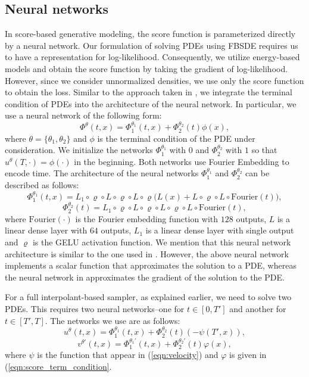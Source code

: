 \subsection{Neural networks}
In score-based generative modeling, the score function is parameterized directly by a neural network. Our formulation of solving PDEs using FBSDE requires us to have a representation for log-likelihood. Consequently, we utilize energy-based models and obtain the score function by taking the gradient of log-likelihood. However, since we consider unnormalized densities, we use only the score function to obtain the loss. Similar to the approach taken in \cite{zhang_path_2022,vargas_denoising_2022,berner_optimal_2023}, we integrate the terminal condition of PDEs into the architecture of the neural network. In particular, we use a neural network of the following form:
\begin{equation*}
     \Phi^\theta(t,x) = \Phi_1^{\theta_1}(t,x)+\Phi_2^{\theta_2}(t)\phi(x),
\end{equation*}
where $\theta = \{\theta_1,\theta_2\}$ and $\phi$ is the terminal condition of the PDE under consideration. We initialize the networks $\Phi_1^{\theta_1}$ with $0$ and $\Phi_2^{\theta_2}$ with $1$ so that $u^\theta(T,\cdot)=\phi(\cdot)$ in the beginning. Both networks use Fourier Embedding \cite{tancik_fourier_2020} to encode time. The architecture of the neural networks $\Phi_1^{\theta_1}$ and $\Phi_2^{\theta_2}$ can be described as follows:
$$
\Phi_1^{\theta_1}(t,x) = L_1\circ\varrho\circ L\circ\varrho\circ L\circ\varrho\bigg(L(x)+L\circ\varrho\circ L\circ\text{Fourier}(t)\bigg), 
$$
$$
\Phi_2^{\theta_2}(t) = L_1\circ\varrho\circ L\circ\varrho\circ L\circ\varrho\circ L\circ\text{Fourier}(t),
$$
where $\text{Fourier}(\cdot)$ is the Fourier embedding function with $128$ outputs, $L$ is a linear dense layer with $64$ outputs, $L_1$ is a linear dense layer with single output and $\varrho$ is the GELU \cite{hendrycks_gaussian_2023} activation function. We mention that this neural network architecture is similar to the one used in \cite{berner_optimal_2023}. However, the above neural network implements a scalar function that approximates the solution to a PDE, whereas the neural network in  \cite{berner_optimal_2023} approximates the gradient of the solution to the PDE.

For a full interpolant-based sampler, as explained earlier, we need to solve two PDEs. This requires two neural networks--one for $t\in[0,T']$ and another for $t\in[T',T]$. The networks we use are as follows:
$$
u^\theta(t,x) = \Phi_1^{\theta_1}(t,x)+\Phi_2^{\theta_2}(t)(-\psi(T',x)),
$$
$$
v^{\theta'}(t,x) = \Phi_1^{\theta_1'}(t,x)+\Phi_2^{\theta_2'}(t)\varphi(x),
$$
where $\psi$ is the function that appear in (\ref{eqn:velocity}) and $\varphi$ is given in (\ref{eqn:score_term_condition}.

